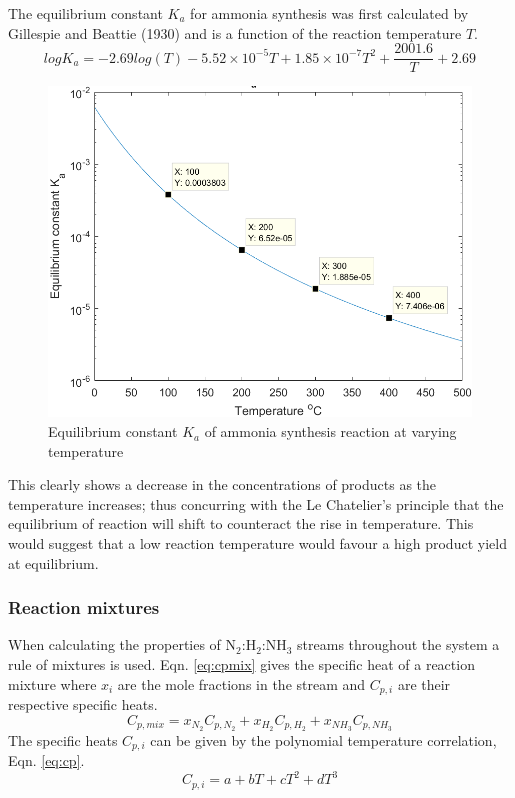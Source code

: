 \documentclass[11pt, a4paper]{article}
\begin{document}
{The equilibrium constant $K_a$ for ammonia synthesis was first calculated by Gillespie and Beattie (1930)\cite{Gillespie1930} and is a function of the reaction temperature $T$.
\begin{equation}
logK_a = -2.69log(T) - 5.52\times10^{-5}T + 1.85\times10^{-7}T^2+\frac{2001.6}{T}+2.69
\end{equation}
{\begin{figure}[h]
\begin{center}
\includegraphics[scale=0.44]{K_a_varying_temperatureNEW}
		\caption{Equilibrium constant $K_a$ of ammonia synthesis reaction at varying temperature}
\end{center}
\end{figure}}

This clearly shows a decrease in the concentrations of products as the temperature increases; thus concurring with the Le Chatelier's principle that the equilibrium of reaction will shift to counteract the rise in temperature. This would suggest that a low reaction temperature would favour a high product yield at equilibrium.

\subsubsection{Reaction mixtures}
When calculating the properties of N$_2$:H$_2$:NH$_3$ streams throughout the system a rule of mixtures is used. Eqn. \ref{eq:cpmix} gives the specific heat of a reaction mixture where $x_{i}$ are the mole fractions in the stream and $C_{p,i}$ are their respective specific heats. 
\begin{equation}
\label{eq:cpmix}
	C_{p,mix} = x_{N_2}C_{p,N_2} + x_{H_2}C_{p,H_2} + x_{NH_3}C_{p,NH_3}
\end{equation}
The specific heats  $C_{p,i}$ can be given by the polynomial temperature correlation, Eqn. \ref{eq:cp}.
\begin{equation}
\label{eq:cp}
C_{p,i} = a + bT + cT^2 + dT^3
\end{equation}

}
\end{document}
